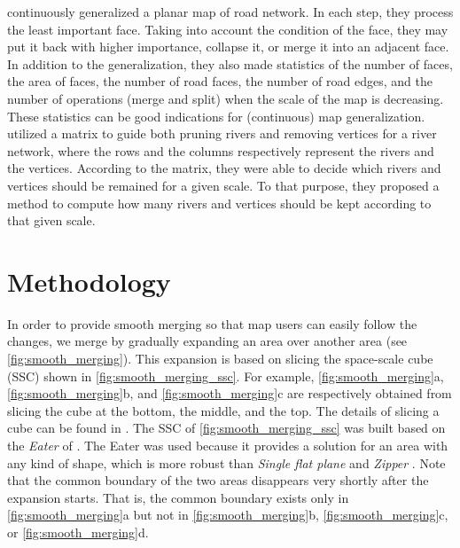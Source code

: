 \documentclass[ijgi,article,submit,moreauthors,pdftex]{Definitions/mdpi}
\begin{document}
\citet{Suba2016Road} continuously generalized a planar map of road network.
In each step, they process the least important face.
Taking into account the condition of the face,
they may put it back with higher importance, collapse it, 
or merge it into an adjacent face.
In addition to the generalization, 
they also made statistics of the number of faces,
the area of faces, the number of road faces, the number of road edges,
and the number of operations (merge and split) 
when the scale of the map is decreasing.
These statistics can be good indications 
for (continuous) map generalization.
\citet{Huang2017Matrix} utilized a matrix to guide 
both pruning rivers and removing vertices for a river network, 
where the rows and the columns respectively represent
the rivers and the vertices.
According to the matrix, 
they were able to decide which rivers and vertices 
should be remained for a given scale.
To that purpose, they proposed a method 
to compute how many rivers and vertices 
should be kept according to that given scale.






%

\section{Methodology}
\label{sec:methodology}



In order to provide smooth merging
so that map users can easily follow the changes,
we merge by gradually expanding an area over another area
(see \fig\ref{fig:smooth_merging}).
This expansion is based on slicing the space-scale cube (SSC) shown in
\fig\ref{fig:smooth_merging_ssc}.
For example, \figs\ref{fig:smooth_merging}a,
\ref{fig:smooth_merging}b, and \ref{fig:smooth_merging}c
are respectively obtained from slicing the cube 
at the bottom, the middle, and the top.
The details of slicing a cube can be found in \citet{Meijers2020Web}.
The SSC of \fig\ref{fig:smooth_merging_ssc} was built 
based on the \emph{Eater} of \citet{Suba2014Merge}.
The Eater was used because it provides a solution 
for an area with any kind of shape, which is more robust than
\emph{Single flat plane} and \emph{Zipper} \citep{Suba2014Merge}.
Note that the common boundary of the two areas disappears
very shortly after the expansion starts.
That is, the common boundary exists only in 
\fig\ref{fig:smooth_merging}a but not in
\figs\ref{fig:smooth_merging}b,
\ref{fig:smooth_merging}c, or \ref{fig:smooth_merging}d.
\end{document}
